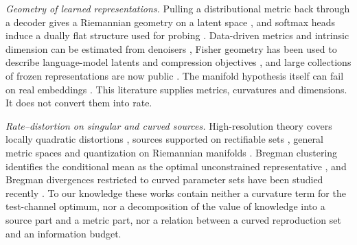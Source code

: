 \documentclass[10pt,journal]{IEEEtran}
\begin{document}
\emph{Geometry of learned representations.} Pulling a distributional metric back through a decoder gives a Riemannian geometry on a latent space \cite{arvanitidis2021latentspaceodditycurvature,arvanitidis2022pullinginformationgeometry}, and softmax heads induce a dually flat structure used for probing \cite{park2026informationgeometrysoftmaxprobing}. Data-driven metrics and intrinsic dimension can be estimated from denoisers \cite{bamberger2026metric,pmlr-v235-stanczuk24a}, Fisher geometry has been used to describe language-model latents and compression objectives \cite{mabrok2026latent,wang2026geoibgeometryawareinformationbottleneck}, and large collections of frozen representations are now public \cite{pandolfo2026semasialargescaledatasetsemantically}. The manifold hypothesis itself can fail on real embeddings \cite{Robinson_2025}. This literature supplies metrics, curvatures and dimensions. It does not convert them into rate.

\emph{Rate--distortion on singular and curved sources.} High-resolution theory covers locally quadratic distortions \cite{linder1999high}, sources supported on rectifiable sets \cite{koliander2016entropy}, general metric spaces \cite{riegler2023lossy} and quantization on Riemannian manifolds \cite{iacobelli2016quantization}. Bregman clustering identifies the conditional mean as the optimal unconstrained representative \cite{JMLR:v6:banerjee05b}, and Bregman divergences restricted to curved parameter sets have been studied recently \cite{nielsen2026curvedrepresentationalbregmandivergences}. To our knowledge these works contain neither a curvature term for the test-channel optimum, nor a decomposition of the value of knowledge into a source part and a metric part, nor a relation between a curved reproduction set and an information budget.
\end{document}
